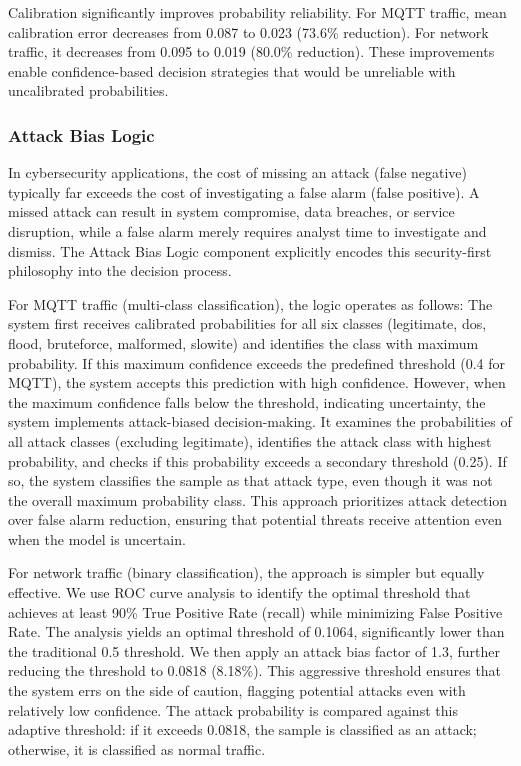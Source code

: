\documentclass[conference]{IEEEtran}
\begin{document}
Calibration significantly improves probability reliability. For MQTT traffic, mean calibration error decreases from 0.087 to 0.023 (73.6\% reduction). For network traffic, it decreases from 0.095 to 0.019 (80.0\% reduction). These improvements enable confidence-based decision strategies that would be unreliable with uncalibrated probabilities.

\subsubsection{Attack Bias Logic}

In cybersecurity applications, the cost of missing an attack (false negative) typically far exceeds the cost of investigating a false alarm (false positive). A missed attack can result in system compromise, data breaches, or service disruption, while a false alarm merely requires analyst time to investigate and dismiss. The Attack Bias Logic component explicitly encodes this security-first philosophy into the decision process.

For MQTT traffic (multi-class classification), the logic operates as follows: The system first receives calibrated probabilities for all six classes (legitimate, dos, flood, bruteforce, malformed, slowite) and identifies the class with maximum probability. If this maximum confidence exceeds the predefined threshold (0.4 for MQTT), the system accepts this prediction with high confidence. However, when the maximum confidence falls below the threshold, indicating uncertainty, the system implements attack-biased decision-making. It examines the probabilities of all attack classes (excluding legitimate), identifies the attack class with highest probability, and checks if this probability exceeds a secondary threshold (0.25). If so, the system classifies the sample as that attack type, even though it was not the overall maximum probability class. This approach prioritizes attack detection over false alarm reduction, ensuring that potential threats receive attention even when the model is uncertain.

For network traffic (binary classification), the approach is simpler but equally effective. We use ROC curve analysis to identify the optimal threshold that achieves at least 90\% True Positive Rate (recall) while minimizing False Positive Rate. The analysis yields an optimal threshold of 0.1064, significantly lower than the traditional 0.5 threshold. We then apply an attack bias factor of 1.3, further reducing the threshold to 0.0818 (8.18\%). This aggressive threshold ensures that the system errs on the side of caution, flagging potential attacks even with relatively low confidence. The attack probability is compared against this adaptive threshold: if it exceeds 0.0818, the sample is classified as an attack; otherwise, it is classified as normal traffic.
\end{document}

